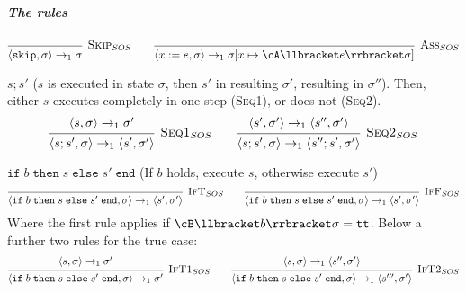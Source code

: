 \subparagraph{The rules}
\[
    \begin{prooftree}
        \infer0[\textsc{Skip}$_{SOS}$]{\langle \texttt{skip}, \sigma \rangle \rightarrow_1 \sigma}
    \end{prooftree}
    \qquad
    \begin{prooftree}
        \infer0[\textsc{Ass}$_{SOS}$]{\langle x := e, \sigma \rangle \rightarrow_1 \sigma[x \mapsto \cA\llbracket e \rrbracket \sigma ]}
    \end{prooftree}
\]

 $s;s'$ ($s$ is executed in state $\sigma$, then $s'$ in resulting $\sigma'$, resulting in $\sigma''$).
Then, either $s$ executes completely in one step (\textsc{Seq1}), or does not (\textsc{Seq2}).
\[
    \begin{prooftree}
        \hypo{\langle s, \sigma \rangle \rightarrow_1 \sigma'}
        \infer1[\textsc{Seq1}$_{SOS}$]{\langle s;s', \sigma \rangle \rightarrow_1 \langle s', \sigma' \rangle}
    \end{prooftree}
    \qquad
    \begin{prooftree}
        \hypo{\langle s', \sigma' \rangle \rightarrow_1 \langle s'', \sigma' \rangle}
        \infer1[\textsc{Seq2}$_{SOS}$]{\langle s;s', \sigma \rangle \rightarrow_1 \langle s'';s', \sigma' \rangle}
    \end{prooftree}
\]

 $\texttt{if}\; b \; \texttt{then} \; s \; \texttt{else} \; s' \; \texttt{end}$ (If $b$ holds, execute $s$, otherwise execute $s'$)
\[
    \begin{prooftree}
        \infer0[\textsc{IfT}$_{SOS}$]{\langle \texttt{if}\; b \; \texttt{then} \; s \; \texttt{else} \; s' \; \texttt{end}, \sigma \rangle \rightarrow_1 \langle s', \sigma' \rangle}
    \end{prooftree}
    \qquad
    \begin{prooftree}
        \infer0[\textsc{IfF}$_{SOS}$]{\langle \texttt{if}\; b \; \texttt{then} \; s \; \texttt{else} \; s' \; \texttt{end}, \sigma \rangle \rightarrow_1 \langle s', \sigma' \rangle}
    \end{prooftree}
\]
Where the first rule applies if $\cB\llbracket b \rrbracket \sigma = \texttt{tt}$. Below a further two rules for the true case:
\[
    \begin{prooftree}
        \hypo{\langle s, \sigma \rangle \rightarrow_1 \sigma'}
        \infer1[\textsc{IfT1}$_{SOS}$]{\langle \texttt{if}\; b \; \texttt{then} \; s \; \texttt{else} \; s' \; \texttt{end}, \sigma \rangle \rightarrow_1 \sigma'}
    \end{prooftree}
    \qquad
    \begin{prooftree}
        \hypo{\langle s, \sigma \rangle \rightarrow_1 \langle s'', \sigma' \rangle}
        \infer1[\textsc{IfT2}$_{SOS}$]{\langle \texttt{if}\;b \; \texttt{then} \; s \; \texttt{else} \; s' \; \texttt{end}, \sigma \rangle \rightarrow_1 \langle s''', \sigma' \rangle}
    \end{prooftree}
\]


